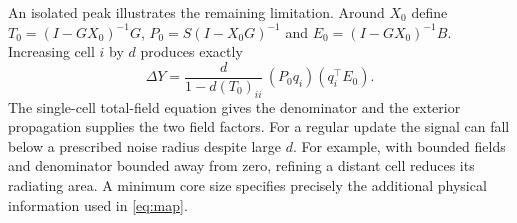 An isolated peak illustrates the remaining limitation. Around $X_0$ define $T_0=(I-GX_0)^{-1}G$, $P_0=S(I-X_0G)^{-1}$ and $E_0=(I-GX_0)^{-1}B$. Increasing cell $i$ by $d$ produces exactly
\begin{equation}
 \Delta Y=\frac{d}{1-d(T_0)_{ii}}\,
          (P_0 q_i)(q_i^\top E_0).
 \label{eq:spike}
\end{equation}
The single-cell total-field equation gives the denominator and the exterior propagation supplies the two field factors. For a regular update the signal can fall below a prescribed noise radius despite large $d$. For example, with bounded fields and denominator bounded away from zero, refining a distant cell reduces its radiating area. A minimum core size specifies precisely the additional physical information used in \eqref{eq:map}.
